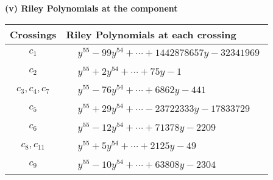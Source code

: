 \documentclass[1p]{elsarticle_modified}
\theoremstyle{definition}
\begin{document}
\newpage\renewcommand{\arraystretch}{1}
\flushleft \textbf{(v) Riley Polynomials at the component}\newline \\
\begin{tabular}{m{50pt}|m{274pt}}
Crossings & \hspace{64pt}Riley Polynomials at each crossing \\
\hline $$\begin{aligned}c_{1}\end{aligned}$$&$\begin{aligned}
&y^{55}-99 y^{54}+\cdots+1442878657 y-32341969
\end{aligned}$\\
\hline $$\begin{aligned}c_{2}\end{aligned}$$&$\begin{aligned}
&y^{55}+2 y^{54}+\cdots+75 y-1
\end{aligned}$\\
\hline $$\begin{aligned}c_{3},c_{4},c_{7}\end{aligned}$$&$\begin{aligned}
&y^{55}-76 y^{54}+\cdots+6862 y-441
\end{aligned}$\\
\hline $$\begin{aligned}c_{5}\end{aligned}$$&$\begin{aligned}
&y^{55}+29 y^{54}+\cdots-23722333 y-17833729
\end{aligned}$\\
\hline $$\begin{aligned}c_{6}\end{aligned}$$&$\begin{aligned}
&y^{55}-12 y^{54}+\cdots+71378 y-2209
\end{aligned}$\\
\hline $$\begin{aligned}c_{8},c_{11}\end{aligned}$$&$\begin{aligned}
&y^{55}+5 y^{54}+\cdots+2125 y-49
\end{aligned}$\\
\hline $$\begin{aligned}c_{9}\end{aligned}$$&$\begin{aligned}
&y^{55}-10 y^{54}+\cdots+63808 y-2304
\end{aligned}$\\

\end{tabular}
\end{document}
